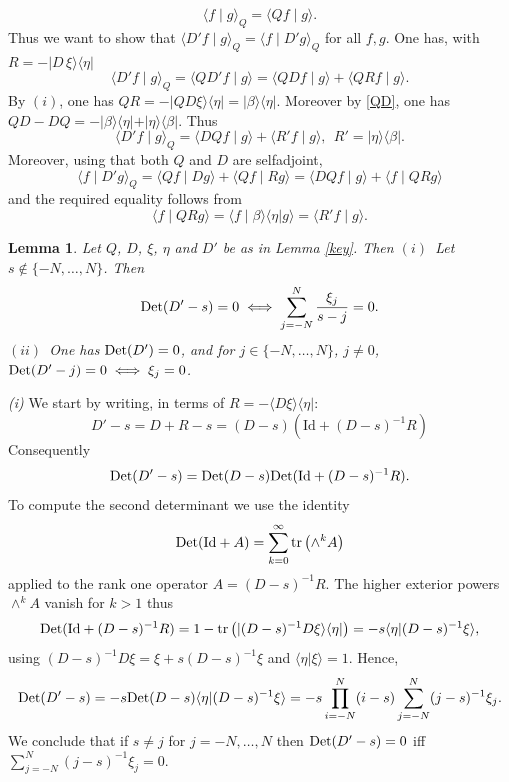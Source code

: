 \documentclass{amsart}
\newtheorem{lem}[thm]{Lemma}
\def\Det{{\rm Det}}
\def\id{{\rm id}}
\def\tr{{\rm Tr}}
\def\tr{{\rm tr}}
\def\id{{\mbox{Id}}}
\def\id{{\rm id}}
\def\tr{{\rm tr}}
\def\tr{{\rm tr}}
\def\id{{\mbox{Id}}}
\def\Det{{\rm Det}}
\begin{document}
$$
\langle f\mid g\rangle_Q=\langle Q f\mid g\rangle.
$$
Thus we want to show that $\langle D' f\mid g\rangle_Q=\langle f\mid D'g\rangle_Q$ for all $f,g$. One has, with $R=-\vert D\,\xi\rangle\langle \eta\vert$ 
$$
\langle D' f\mid g\rangle_Q=\langle Q D'f\mid g\rangle=\langle Q Df\mid g\rangle+\langle Q Rf\mid g\rangle.
$$
By $(i)$, one has $QR=-\vert QD\xi\rangle \langle \eta\vert=\vert \beta\rangle\langle \eta\vert$. Moreover by \eqref{QD}, one has $QD-DQ=-\vert \beta\rangle\langle \eta\vert +\vert \eta\rangle\langle \beta\vert$. Thus 
$$
\langle D' f\mid g\rangle_Q=\langle DQf\mid g\rangle+\langle R'f\mid g\rangle, \ \ R'=\vert \eta\rangle\langle \beta\vert.
$$
 Moreover, using that both $Q$ and $D$ are selfadjoint,  
 $$
 \langle f\mid D'g\rangle_Q=\langle Qf\mid D g\rangle+\langle Qf\mid R g\rangle=\langle DQf\mid g\rangle+\langle f\mid QR g\rangle
 $$
 and the required equality follows from 
 $$
 \langle f\mid QR g\rangle=\langle f\mid  \beta\rangle\langle \eta\vert g\rangle=\langle R'f\mid g\rangle.
 $$
 \endproof 
 \begin{lem}\label{lem-main} Let $Q$, $D$, $\xi$, $\eta$ and $D'$ be as in Lemma \ref{key}. Then \newline
 $(i)$~Let $s\notin \{-N,\ldots,N\}$. Then 
 \begin{equation}\label{equiv}
 {\rm Det}(D'-s)=0\iff \sum_{j=-N}^N \frac{\xi_j}{s-j}=0.
\end{equation}
 $(ii)$~One has $ {\rm Det}(D')=0$, and for $j\in \{-N,\ldots,N\}$, $j\neq 0$, ${\rm Det}(D'-j)=0\iff \xi_j=0$. 	
 \end{lem}
 \proof 
 {\em (i)}
 We start by writing, in terms of $R =- \langle D \xi \rangle \langle \eta |$:
 $$
D' -s = D+ R-s = (D-s) \left (\id + (D-s)^{-1} R\right)
$$
Consequently 
$$
\Det(D' - s) = \Det(D-s) \Det (\id + (D-s)^{-1} R).
$$
To compute the second determinant we use the identity 
$$
 \Det (\id + A )=\sum_{k=0}^{\infty} \tr\left(\wedge^k A\right)
$$
applied to the rank one operator $A= (D-s)^{-1} R$. The  higher exterior powers $\wedge^k A$ vanish for $k>1$ thus
$$
 \Det (\id + (D-s)^{-1} R )= 1 - \tr \left( | (D-s)^{-1} D \xi \rangle \langle \eta | \right) = -s \langle \eta | (D-s)^{-1} \xi \rangle, 
 $$
 using $(D-s)^{-1} D \xi =\xi+ s (D-s)^{-1}\xi$ and $ \langle \eta | \xi\rangle=1$.
 Hence,
 \begin{equation}
   \Det(D' - s) = -s \Det (D-s) \langle \eta | (D-s)^{-1}\xi  \rangle = -s \prod_{i=-N}^N (i -s) \sum_{j=-N}^N (j -s)^{-1} \xi_j.
   \label{eq:detDp}
 \end{equation}
 We conclude that if $s \neq j$ for $j = -N, \ldots, N$ then $\Det (D' -s)=0$ iff $\sum_{j=-N}^ N (j -s)^{-1} \xi_j =0$.
\end{document}
